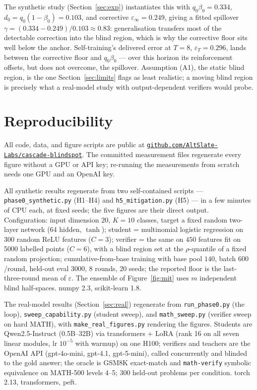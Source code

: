 \documentclass[11pt]{article}
\begin{document}
The synthetic study (Section~\ref{sec:exp}) instantiates this with
\(q_{0}\beta_{0} = 0.334\),
\(d_{0} = q_{0}\left( 1 - \beta_{0} \right) = 0.103\), and corrective
\(\varepsilon_{\infty} = 0.249\), giving a fitted spillover
\(\gamma = (0.334 - 0.249)/0.103 \approx 0.83\): generalisation
transfers most of the detectable correction into the blind region, which
is why the corrective floor sits well below the anchor. Self-training's
delivered error at \(T = 8\), \(\varepsilon_{T} = 0.296\), lands between
the corrective floor and \(q_{0}\beta_{0}\) --- over this horizon its
reinforcement offsets, but does not overcome, the spillover. Assumption
(A1), the static blind region, is the one Section~\ref{sec:limits} flags
as least realistic; a moving blind region is precisely what a real-model
study with output-dependent verifiers would probe.

\section{Reproducibility}

\protect{}\label{sec:repro}{}

All code, data, and figure scripts are public at
\href{https://github.com/AltSlate-Labs/cascade-blindspot}{\texttt{github.com/AltSlate-Labs/cascade-blindspot}}.
The committed measurement files regenerate every figure without a GPU or
API key; re-running the measurements from scratch needs one GPU and an
OpenAI key.

All synthetic results regenerate from two self-contained scripts ---
\texttt{phase0\_synthetic.py} (H1--H4) and \texttt{h5\_mitigation.py}
(H5) --- in a few minutes of CPU each, at fixed seeds; the five figures
are their direct output. Configuration: input dimension \(20\),
\(K = 10\) classes, target a fixed random two-layer network (64 hidden,
\(\tanh\)); student = multinomial logistic regression on \(300\) random
ReLU features (\(C = 3\)); verifier = the same on \(450\) features fit
on 5000 labelled points (\(C = 6\)), with a blind region set at the
\(\rho\)-quantile of a fixed random projection; cumulative-from-base
training with base pool \(140\), batch \(600\)/round, held-out eval
3000, \(8\) rounds, \(20\) seeds; the reported floor is the
last-three-round mean of \(\varepsilon\). The ensemble of
Figure~\ref{fig:mit} uses \(m\) independent blind half-spaces. numpy
2.3, scikit-learn 1.8.

The real-model results (Section~\ref{sec:real}) regenerate from
\texttt{run\_phase0.py} (the loop), \texttt{sweep\_capability.py}
(student sweep), and \texttt{math\_sweep.py} (verifier sweep on hard
MATH), with \texttt{make\_real\_figures.py} rendering the figures.
Students are Qwen2.5-Instruct (0.5B--32B) via transformers + LoRA (rank
16 on all seven linear modules, lr \(10^{- 5}\) with warmup) on one
H100; verifiers and teachers are the OpenAI API (gpt-4o-mini, gpt-4.1,
gpt-5-mini), called concurrently and blinded to the gold answer; the
oracle is GSM8K exact-match and \texttt{math-verify} symbolic
equivalence on MATH-500 levels 4--5; \(300\) held-out problems per
condition. torch 2.13, transformers, peft.



\end{document}
